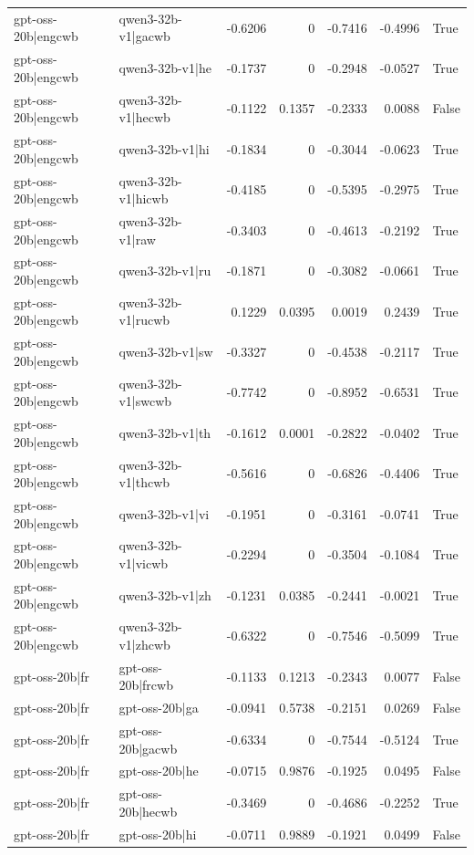 \begin{table}
\begin{tabular}{l l r r r r l}
gpt-oss-20b|engcwb & qwen3-32b-v1|gacwb & -0.6206 & 0 & -0.7416 & -0.4996 & True \\
gpt-oss-20b|engcwb & qwen3-32b-v1|he & -0.1737 & 0 & -0.2948 & -0.0527 & True \\
gpt-oss-20b|engcwb & qwen3-32b-v1|hecwb & -0.1122 & 0.1357 & -0.2333 & 0.0088 & False \\
gpt-oss-20b|engcwb & qwen3-32b-v1|hi & -0.1834 & 0 & -0.3044 & -0.0623 & True \\
gpt-oss-20b|engcwb & qwen3-32b-v1|hicwb & -0.4185 & 0 & -0.5395 & -0.2975 & True \\
gpt-oss-20b|engcwb & qwen3-32b-v1|raw & -0.3403 & 0 & -0.4613 & -0.2192 & True \\
gpt-oss-20b|engcwb & qwen3-32b-v1|ru & -0.1871 & 0 & -0.3082 & -0.0661 & True \\
gpt-oss-20b|engcwb & qwen3-32b-v1|rucwb & 0.1229 & 0.0395 & 0.0019 & 0.2439 & True \\
gpt-oss-20b|engcwb & qwen3-32b-v1|sw & -0.3327 & 0 & -0.4538 & -0.2117 & True \\
gpt-oss-20b|engcwb & qwen3-32b-v1|swcwb & -0.7742 & 0 & -0.8952 & -0.6531 & True \\
gpt-oss-20b|engcwb & qwen3-32b-v1|th & -0.1612 & 0.0001 & -0.2822 & -0.0402 & True \\
gpt-oss-20b|engcwb & qwen3-32b-v1|thcwb & -0.5616 & 0 & -0.6826 & -0.4406 & True \\
gpt-oss-20b|engcwb & qwen3-32b-v1|vi & -0.1951 & 0 & -0.3161 & -0.0741 & True \\
gpt-oss-20b|engcwb & qwen3-32b-v1|vicwb & -0.2294 & 0 & -0.3504 & -0.1084 & True \\
gpt-oss-20b|engcwb & qwen3-32b-v1|zh & -0.1231 & 0.0385 & -0.2441 & -0.0021 & True \\
gpt-oss-20b|engcwb & qwen3-32b-v1|zhcwb & -0.6322 & 0 & -0.7546 & -0.5099 & True \\
gpt-oss-20b|fr & gpt-oss-20b|frcwb & -0.1133 & 0.1213 & -0.2343 & 0.0077 & False \\
gpt-oss-20b|fr & gpt-oss-20b|ga & -0.0941 & 0.5738 & -0.2151 & 0.0269 & False \\
gpt-oss-20b|fr & gpt-oss-20b|gacwb & -0.6334 & 0 & -0.7544 & -0.5124 & True \\
gpt-oss-20b|fr & gpt-oss-20b|he & -0.0715 & 0.9876 & -0.1925 & 0.0495 & False \\
gpt-oss-20b|fr & gpt-oss-20b|hecwb & -0.3469 & 0 & -0.4686 & -0.2252 & True \\
gpt-oss-20b|fr & gpt-oss-20b|hi & -0.0711 & 0.9889 & -0.1921 & 0.0499 & False \\

\end{tabular}
\end{table}
